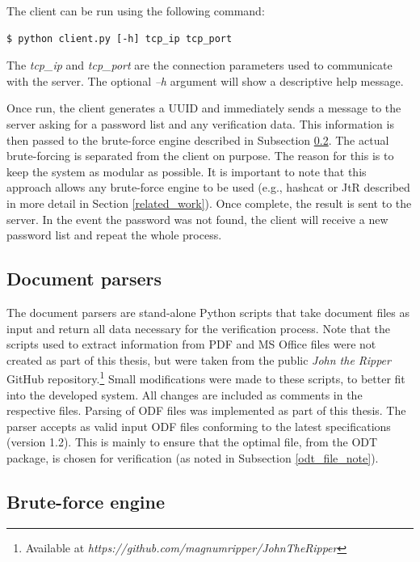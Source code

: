 \documentclass[11pt,oneside]{fithesis2}
\begin{document}
The client can be run using the following command:
\begin{lstlisting}
$ python client.py [-h] tcp_ip tcp_port 
\end{lstlisting}

The \textit{tcp\_ip} and \textit{tcp\_port} are the connection parameters used to communicate with the server. The optional \textit{–h} argument will show a descriptive help message. 

Once run, the client generates a UUID and immediately sends a message to the server asking for a password list and any verification data. This information is then passed to the brute-force engine described in Subsection \ref{brute_force_engine}. The actual brute-forcing is separated from the client on purpose. The reason for this is to keep the system as modular as possible. It is important to note that this approach allows any brute-force engine to be used (e.g., hashcat or JtR \cite{hashcat, jtr} described in more detail in Section \ref{related_work}).\label{jtrhc_modular} Once complete, the result is sent to the server. In the event the password was not found, the client will receive a new password list and repeat the whole process.

\subsection{Document parsers} \label{doc_parsers}

The document parsers are stand-alone Python scripts that take document files as input and return all  data necessary for the verification process. Note that the scripts used to extract information from PDF and MS Office files were not created as part of this thesis, but were taken from the public \textit{John the Ripper} GitHub repository.\footnote{Available at \textit{https://github.com/magnumripper/JohnTheRipper}} Small modifications were made to these scripts, to better fit into the developed system. All changes are included as comments in the respective files. Parsing of ODF files was implemented as part of this thesis. The parser accepts as valid input ODF files conforming to the latest specifications (version 1.2). This is mainly to ensure that the optimal file, from the ODT package, is chosen for verification (as noted in Subsection \ref{odt_file_note}).

\subsection{Brute-force engine}\label{brute_force_engine}
\end{document}
